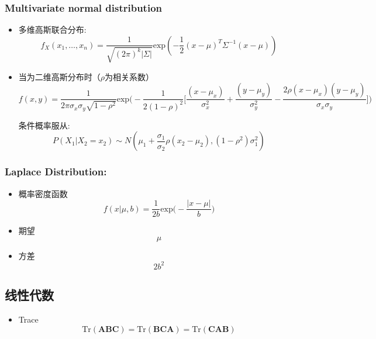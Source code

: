 \documentclass{article} 	%
\begin{document}
                \subsubsection{Multivariate normal distribution}
                        \begin{itemize}
                                \item
                                多维高斯联合分布:
                                $$f_X(x_1,\ldots,x_n) = \frac{1}{\sqrt{(2\pi)^k|\Sigma|}}\mathrm{exp}(-\frac{1}{2}(x-\mu)^T\Sigma^{-1}(x-\mu))$$
                                
                                \item
                                当为二维高斯分布时（$\rho$为相关系数）\\
                                $$f(x,y) = \frac{1}{2\pi\sigma_x\sigma_y\sqrt{1-\rho^2}}\mathrm{exp}\Big( -\frac{1}{2(1-\rho)^2} 
                                \Big[\frac{(x-\mu_x)}{\sigma_x^2}+\frac{(y-\mu_y)}{\sigma_y^2} - \frac{2\rho(x-\mu_x)(y-\mu_y)}{\sigma_x\sigma_y}\Big]\Big)$$
                                
                                条件概率服从:
                                $$P(X_1\big|X_2 =x_2)\sim N(\mu_1 +\frac{\sigma_1}{\sigma_2}\rho(x_2-\mu_2),(1-\rho^2)\sigma_1^2)$$
                        \end{itemize}
	        
	        \subsubsection{Laplace Distribution:}
	        		\begin{itemize}
			\item
			概率密度函数\\
			$$f(x|\mu,b)= \displaystyle\frac{1}{2b} \mathrm{exp}\big(-\frac{|x-\mu|}{b}\big)$$
			\item
			期望\\
			$$\mu$$
			\item
			方差\\
			$$2b^2$$
			\end{itemize}
	\subsection{线性代数}
		\begin{itemize}
		\item
		Trace\\
		$$\mathrm{Tr}(\mathbf{ABC}) = \mathrm{Tr}(\mathbf{BCA}) =\mathrm{Tr}(\mathbf{CAB})$$ 
		\end{itemize}
\end{document}
